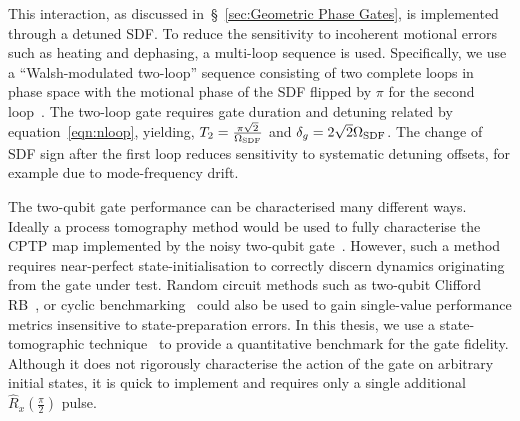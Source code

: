     This interaction, as discussed in~\S~\ref{sec:Geometric Phase Gates}, is
    implemented through a detuned SDF.
    To reduce the sensitivity to incoherent motional errors such as heating and dephasing, a multi-loop 
    sequence is used. Specifically, we use a ``Walsh-modulated two-loop'' sequence consisting of two complete loops in phase space with the motional phase of the SDF flipped by $\pi$ for the second loop~\cite{hayes_coherent_2012}. The two-loop gate requires
    gate duration and detuning related by
    equation~\ref{eqn:nloop}, yielding, $T_2 = \frac{\pi\sqrt{2}}{\Omega_{\rm
    SDF}}$ and $\delta_g = 2\sqrt{2}\Omega_{\rm SDF}$. The 
    change of SDF sign after the first loop reduces sensitivity to
    systematic detuning offsets, for example due to mode-frequency drift.

    The two-qubit gate performance can be characterised many different ways.
    Ideally a process tomography method would be used to fully characterise the
    CPTP map implemented by the noisy two-qubit
    gate~\cite{chuang_prescription_1997}. However, such a method requires
    near-perfect state-initialisation to correctly discern dynamics originating
    from the gate under test. Random circuit methods such as two-qubit Clifford
    RB~\cite{gaebler_randomized_2012}, or cyclic
    benchmarking~\cite{erhard_characterizing_2019} could also be used to gain
    single-value performance metrics insensitive to state-preparation errors. 
    In this thesis, we use a state-tomographic technique~\cite{sackett_experimental_2000} to provide a quantitative benchmark for the gate fidelity.
    Although it does not rigorously characterise the action of the gate on arbitrary initial states, it is quick to implement and requires only a single additional $\hat R_x(\frac{\pi}{2})$ pulse.

